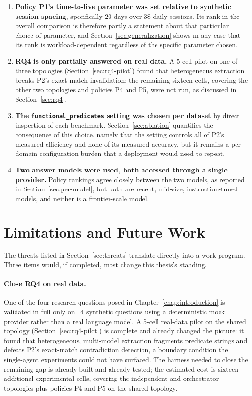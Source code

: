 \begin{enumerate}
\item \textbf{Policy P1's time-to-live parameter was set relative to synthetic session spacing}, specifically 20 days over 38 daily sessions. Its rank in the overall comparison is therefore partly a statement about that particular choice of parameter, and Section~\ref{sec:generalization} shows in any case that its rank is workload-dependent regardless of the specific parameter chosen.
\item \textbf{RQ4 is only partially answered on real data.} A 5-cell pilot on one of three topologies (Section~\ref{sec:rq4-pilot}) found that heterogeneous extraction breaks P2's exact-match invalidation; the remaining sixteen cells, covering the other two topologies and policies P4 and P5, were not run, as discussed in Section~\ref{sec:rq4}.
\item \textbf{The \texttt{functional\_predicates} setting was chosen per dataset} by direct inspection of each benchmark. Section~\ref{sec:ablation} quantifies the consequence of this choice, namely that the setting controls all of P2's measured efficiency and none of its measured accuracy, but it remains a per-domain configuration burden that a deployment would need to repeat.
\item \textbf{Two answer models were used, both accessed through a single provider.} Policy rankings agree closely between the two models, as reported in Section~\ref{sec:per-model}, but both are recent, mid-size, instruction-tuned models, and neither is a frontier-scale model.
\end{enumerate}

\section{Limitations and Future Work}
\label{sec:limitations}

The threats listed in Section~\ref{sec:threats} translate directly into a work program. Three items would, if completed, most change this thesis's standing.

\paragraph{Close RQ4 on real data.} One of the four research questions posed in Chapter~\ref{chap:introduction} is validated in full only on 14 synthetic questions using a deterministic mock provider rather than a real language model. A 5-cell real-data pilot on the shared topology (Section~\ref{sec:rq4-pilot}) is complete and already changed the picture: it found that heterogeneous, multi-model extraction fragments predicate strings and defeats P2's exact-match contradiction detection, a boundary condition the single-agent experiments could not have surfaced. The harness needed to close the remaining gap is already built and already tested; the estimated cost is sixteen additional experimental cells, covering the independent and orchestrator topologies plus policies P4 and P5 on the shared topology.

